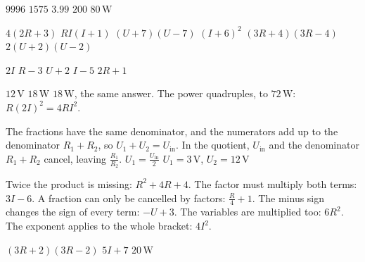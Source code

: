 \begin{facit}
  $9996$  $1575$  $3.99$  $200$  $80\,\text{W}$

  $4(2R + 3)$  $RI(I + 1)$  $(U + 7)(U - 7)$  $(I + 6)^2$
 $(3R + 4)(3R - 4)$  $2(U + 2)(U - 2)$

  $2I$  $R - 3$  $U + 2$  $I - 5$  $2R + 1$

  $12\,\text{V}$  $18\,\text{W}$  $18\,\text{W}$, the same answer.
 The power quadruples, to $72\,\text{W}$: $R(2I)^2 = 4RI^2$.

  The fractions have the same denominator, and the numerators add up to the
denominator $R_1 + R_2$, so $U_1 + U_2 = U_{\text{in}}$.
 In the quotient, $U_{\text{in}}$ and the denominator $R_1 + R_2$ cancel, leaving
$\frac{R_1}{R_2}$.  $U_1 = \frac{U_{\text{in}}}{2}$
 $U_1 = 3\,\text{V}$, $U_2 = 12\,\text{V}$

  Twice the product is missing: $R^2 + 4R + 4$.
 The factor must multiply both terms: $3I - 6$.
 A fraction can only be cancelled by factors: $\frac{R}{4} + 1$.
 The minus sign changes the sign of every term: $-U + 3$.
 The variables are multiplied too: $6R^2$.
 The exponent applies to the whole bracket: $4I^2$.

  $(3R + 2)(3R - 2)$  $5I + 7$
 $20\,\text{W}$

\end{facit}
